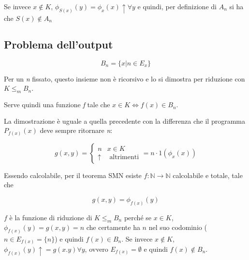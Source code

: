 Se invece $ x \notin K $, $\phi_{S(x)}(y) = \phi_x(x)\uparrow \forall y$ e quindi, per definizione di $A_n$ si ha che $S(x) \notin A_n$

\subsection{Problema dell'output}

$$
B_n = \{ x | n \in E_x \}
$$

Per un \textit{n} fissato, questo insieme non è ricorsivo e lo si dimostra per riduzione con $ K \leq_m B_n $.

Serve quindi una funzione \textit{f} tale che $ x \in K \Leftrightarrow f(x) \in B_n$.

La dimostrazione è uguale a quella precedente con la differenza che il programma $ P_{f(x)}(x) $ deve sempre ritornare \textit{n}:

$$
g(x,y) = \begin{cases}
n & x \in K \\
\uparrow & \text{ altrimenti} 
\end{cases} = n \cdot 1(\phi_x(x))
$$ 

Essendo calcolabile, per il teorema SMN esiste $ f : \mathbb{N} \rightarrow \mathbb{N} $ calcolabile e totale, tale che 

$$
g(x,y) = \phi_{f(x)}(y)
$$

$f$ è la funzione di riduzione di $ K \leq_m B_n $ perché se $ x \in K  $, $\phi_{f(x)}(y) = g(x,y) = n $ che certamente ha $ n $ nel suo codominio ($ n \in E_{f(x)} = \{n\}$) e quindi $f(x) \in B_n$.
Se invece $ x \notin K $, $\phi_{f(x)}(y) \uparrow = g(x.y) \forall y $, ovvero $E_{f(x)} = \emptyset $ e quindi $f(x) \notin B_n$.


